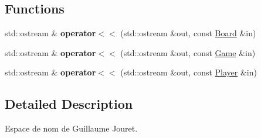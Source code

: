 \subsection*{Functions}
\begin{DoxyCompactItemize}
\item 
\hypertarget{namespaceg40853_a9bc3bc9d9933d581d06606d3d3aeab1b}{}\label{namespaceg40853_a9bc3bc9d9933d581d06606d3d3aeab1b} 
std\+::ostream \& {\bfseries operator$<$$<$} (std\+::ostream \&out, const \hyperlink{classg40853_1_1_board}{Board} \&in)
\item 
\hypertarget{namespaceg40853_a8cf4e6af16f416ab7a4b4cd73cadabd4}{}\label{namespaceg40853_a8cf4e6af16f416ab7a4b4cd73cadabd4} 
std\+::ostream \& {\bfseries operator$<$$<$} (std\+::ostream \&out, const \hyperlink{classg40853_1_1_game}{Game} \&in)
\item 
\hypertarget{namespaceg40853_af9a36095e239f249af151e5e1ec9f7d5}{}\label{namespaceg40853_af9a36095e239f249af151e5e1ec9f7d5} 
std\+::ostream \& {\bfseries operator$<$$<$} (std\+::ostream \&out, const \hyperlink{classg40853_1_1_player}{Player} \&in)
\end{DoxyCompactItemize}


\subsection{Detailed Description}
Espace de nom de Guillaume Jouret. 